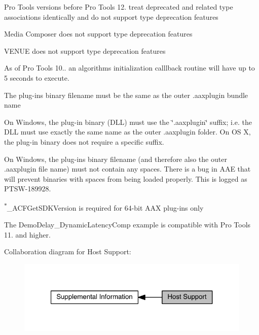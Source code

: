 \begin{DoxyRefList}
\begin{DoxyItemize}
\item Pro Tools versions before Pro Tools 12. treat deprecated and related type associations identically and do not support type deprecation features \item Media Composer does not support type deprecation features \item V\+E\+N\+U\+E does not support type deprecation features  \end{DoxyItemize}

\item[\label{a00381__compatibility_notes000002}%
\hypertarget{a00381__compatibility_notes000002}{}%
Module \hyperlink{a00327}{Common\+Interface\+\_\+\+Algorithm} ]As of Pro Tools 10.. an algorithm\textquotesingle{}s initialization calllback routine will have up to 5 seconds to execute. 
\item[\label{a00381__compatibility_notes000003}%
\hypertarget{a00381__compatibility_notes000003}{}%
Module \hyperlink{a00331}{Common\+Interface\+\_\+\+Format\+Specification} ]\begin{DoxyItemize}
\item The plug-\/in\textquotesingle{}s binary filename must be the same as the outer .aaxplugin bundle name \end{DoxyItemize}
\begin{DoxyItemize}
\item On Windows, the plug-\/in binary (D\+L\+L) must use the \char`\"{}.\+aaxplugin\char`\"{} suffix; i.\+e. the D\+L\+L must use exactly the same name as the outer .aaxplugin folder. On O\+S X, the plug-\/in binary does not require a specific suffix. \end{DoxyItemize}
\begin{DoxyItemize}
\item On Windows, the plug-\/in\textquotesingle{}s binary filename (and therefore also the outer .aaxplugin file name) must not contain any spaces. There is a bug in A\+A\+E that will prevent binaries with spaces from being loaded properly. This is logged as P\+T\+S\+W-\/189928.\end{DoxyItemize}
\textsuperscript{$\ast$}{\ttfamily \+\_\+\+A\+C\+F\+Get\+S\+D\+K\+Version} is required for 64-\/bit A\+A\+X plug-\/ins only 
\item[\label{a00381__compatibility_notes000009}%
\hypertarget{a00381__compatibility_notes000009}{}%
Module \hyperlink{a00376}{Example\+Plug\+Ins} ]The Demo\+Delay\+\_\+\+Dynamic\+Latency\+Comp example is compatible with Pro Tools 11. and higher.
\end{DoxyRefList}Collaboration diagram for Host Support\+:
\nopagebreak
\begin{figure}[H]
\begin{center}
\leavevmode
\includegraphics[width=321pt]{a00373}
\end{center}
\end{figure}

